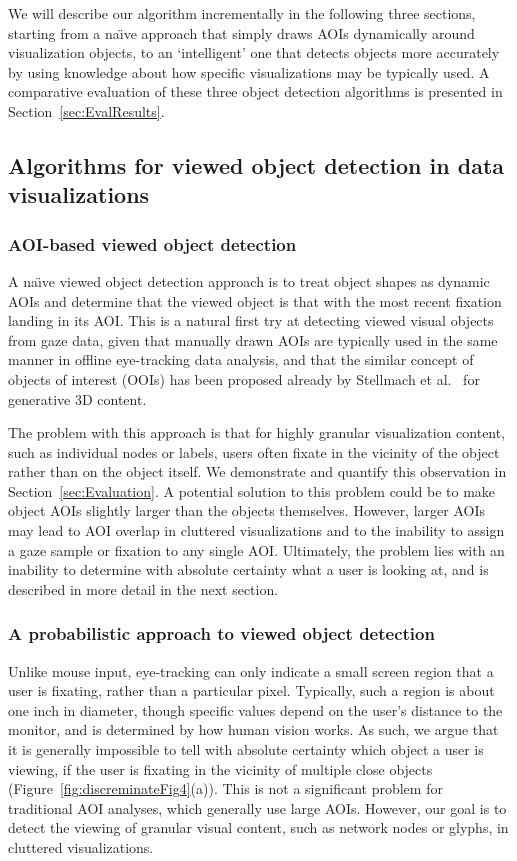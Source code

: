 We will describe our algorithm incrementally in the following three sections, starting from a na\"{\i}ve approach that simply draws AOIs dynamically around visualization objects, to an `intelligent' one that detects objects more accurately by using knowledge about how specific visualizations may be typically used.  A comparative evaluation of these three object detection algorithms is presented in Section~\ref{sec:EvalResults}.

\subsection{Algorithms for viewed object detection in data visualizations}
\label{sec:MethodsAlgorithmsViewedObjectDetection}
\subsubsection{AOI-based viewed object detection}
\label{sec:AOIBasedViewedObjectDetection}
A na\"{\i}ve viewed object detection approach is to treat object shapes as dynamic AOIs and determine that the viewed object is that with the most recent fixation landing in its AOI. This is a natural first try at detecting viewed visual objects from gaze data, given that manually drawn AOIs are typically used in the same manner in offline eye-tracking data analysis, and that the similar concept of objects of interest (OOIs) has been proposed already by Stellmach et al.~\cite{stellmach20103d} for generative 3D content.

The problem with this approach is that for highly granular visualization content, such as individual nodes or labels, users often fixate in the vicinity of the object rather than on the object itself. We demonstrate and quantify this observation in Section~\ref{sec:Evaluation}. A potential solution to this problem could be to make object AOIs slightly larger than the objects themselves. However, larger AOIs may lead to AOI overlap in cluttered visualizations and to the inability to assign a gaze sample or fixation to any single AOI. Ultimately, the problem lies with an inability to determine with absolute certainty what a user is looking at, and is described in more detail in the next section.

\subsubsection{A probabilistic approach to viewed object detection}
\label{sec:ProbabilisticObjectDetection}
Unlike mouse input, eye-tracking can only indicate a small screen region that a user is fixating, rather than a particular pixel. Typically, such a region is about one inch in diameter, though specific values depend on the user's distance to the monitor, and is determined by how human vision works. As such, we argue that it is generally impossible to tell with absolute certainty which object a user is viewing, if the user is fixating in the vicinity of multiple close objects (Figure~\ref{fig:discreminateFig4}(a)). This is not a significant problem for traditional AOI analyses, which generally use large AOIs. However, our goal is to detect the viewing of granular visual content, such as network nodes or glyphs, in cluttered visualizations. 


